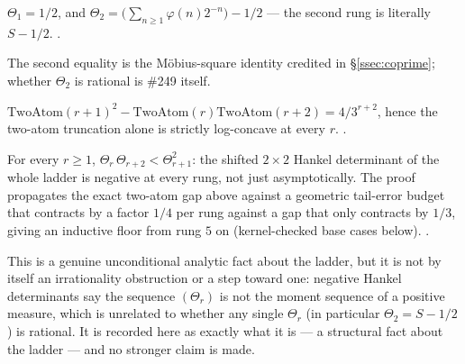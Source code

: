 \begin{thm}
$\Theta_1 = 1/2$, and $\Theta_2 = \bigl(\sum_{n\ge 1}\varphi(n)2^{-n}\bigr) - 1/2$
--- the second rung is literally $S - 1/2$.
\quad {}
\quad {} \quad {} \quad {}.
\end{thm}

\noindent The second equality is the M\"obius-square identity credited in
\S\ref{ssec:coprime}; whether $\Theta_2$ is rational is \#249 itself.

\begin{thm}
$\mathrm{TwoAtom}(r{+}1)^2 - \mathrm{TwoAtom}(r)\mathrm{TwoAtom}(r{+}2) = 4/3^{r+2}$,
hence the two-atom truncation alone is strictly log-concave at every $r$.
\quad {} \quad {} \quad {}.
\end{thm}

\begin{thm}
For every $r\ge 1$, $\Theta_r\,\Theta_{r+2} < \Theta_{r+1}^2$: the shifted
$2\times 2$ Hankel determinant of the whole ladder is negative at every
rung, not just asymptotically. The proof propagates the exact two-atom gap
above against a geometric tail-error budget that contracts by a factor $1/4$
per rung against a gap that only contracts by $1/3$, giving an inductive
floor from rung $5$ on (kernel-checked base cases below).
\quad {}
\quad {}
\quad {} \quad {} \quad {}.
\end{thm}

\begin{obs}
This is a genuine unconditional analytic fact about the ladder, but it is
not by itself an irrationality obstruction or a step toward one: negative
Hankel determinants say the sequence $(\Theta_r)$ is not the moment
sequence of a positive measure, which is unrelated to whether any single
$\Theta_r$ (in particular $\Theta_2 = S - 1/2$) is rational. It is recorded
here as exactly what it is --- a structural fact about the ladder --- and
no stronger claim is made.
\end{obs}

